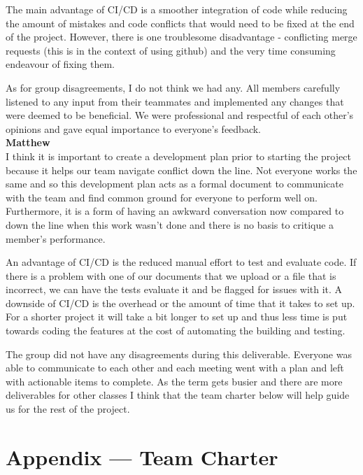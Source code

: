 \documentclass{article}
\begin{document}
The main advantage of CI/CD is a smoother integration of code while reducing the amount of mistakes and code conflicts that would need to be fixed at the end of the project. However, there is one troublesome disadvantage - conflicting merge requests (this is in the context of using github) and the very time consuming endeavour of fixing them. 

As for group disagreements, I do not think we had any. All members carefully listened to any input from their teammates and implemented any changes that were deemed to be beneficial. We were professional and respectful of each other’s opinions and gave equal importance to everyone’s feedback. \\


\textbf{Matthew}\\
I think it is important to create a development plan prior to starting the project because it helps our team navigate conflict down the line. Not everyone works the same and so this development plan acts as a formal document to communicate with the team and find common ground for everyone to perform well on. Furthermore, it is a form of having an awkward conversation now compared to down the line when this work wasn't done and there is no basis to critique a member's performance. 

An advantage of CI/CD is the reduced manual effort to test and evaluate code. If there is a problem with one of our documents that we upload or a file that is incorrect, we can have the tests evaluate it and be flagged for issues with it. A downside of CI/CD is the overhead or the amount of time that it takes to set up. For a shorter project it will take a bit longer to set up and thus less time is put towards coding the features at the cost of automating the building and testing.

The group did not have any disagreements during this deliverable. Everyone was able to communicate to each other and each meeting went with a plan and left with actionable items to complete. As the term gets busier and there are more deliverables for other classes I think that the team charter below will help guide us for the rest of the project.



\newpage{}

\section*{Appendix --- Team Charter}
\end{document}
